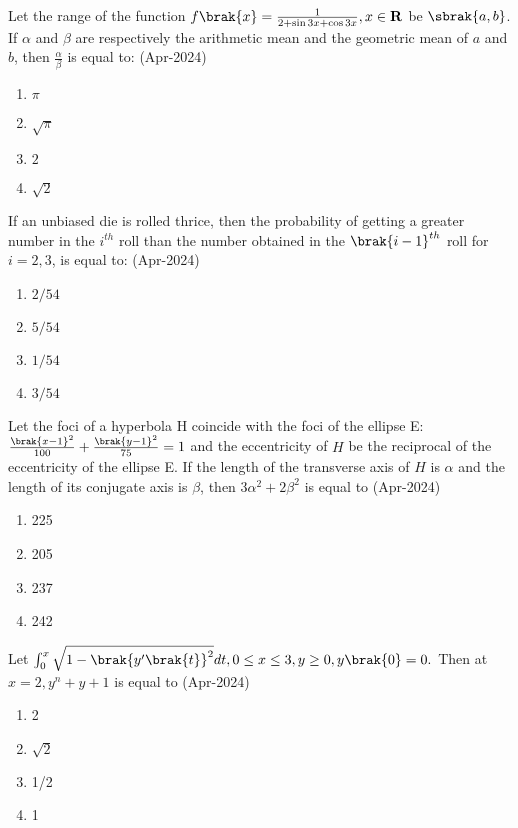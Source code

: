 \iffalse
\title{Assignment}
\author{EE24BTECH11047}
\section{mcq-single}
\fi
\item Let the range of the function $f\brak{x}=\frac{1}{2+\sin{3x}+\cos{3x}},x\in\mathbf{R}$ be $\sbrak{a, b}$. If $\alpha$ and $\beta$ are respectively the arithmetic mean and the geometric mean of $a$ and $b$, then $\frac{\alpha}{\beta}$ is equal to: \hfill(Apr-2024)
\begin{enumerate}
    \item $\pi$
    \item $\sqrt{\pi}$
    \item $2$
    \item $\sqrt{2}$
\end{enumerate}
\item If an unbiased die is rolled thrice, then the probability of getting a greater number in the $i^{th}$ roll than the number obtained in the $\brak{i-1}^{th}$ roll for $i = 2, 3$, is equal to: \hfill(Apr-2024)
\begin{enumerate}
    \item $2/54$
    \item $5/54$
    \item $1/54$
    \item $3/54$
\end{enumerate}
\item Let the foci of a hyperbola H coincide with the foci of the ellipse E:$\frac{\brak{x-1}^2}{100} + \frac{\brak{y-1}^2}{75} = 1$ and the eccentricity of $H$ be the reciprocal of the eccentricity of the ellipse E. If the length of the transverse axis of $H$ is $\alpha$ and the length of its conjugate axis is $\beta$, then $3\alpha^2 + 2\beta^2$ is equal to \hfill(Apr-2024)
\begin{enumerate}
    \item 225
    \item 205
    \item 237
    \item 242
\end{enumerate}
\item Let $\int_0^x\sqrt{1-\brak{y^{\prime}\brak{t}}^2}dt, 0\leq x \leq 3,y\geq 0,y\brak{0}=0.$ Then at $x=2,y^n+y+1$ is equal to \hfill(Apr-2024)
\begin{enumerate}
    \item 2
    \item $\sqrt{2}$
    \item 1/2
    \item 1
\end{enumerate}
